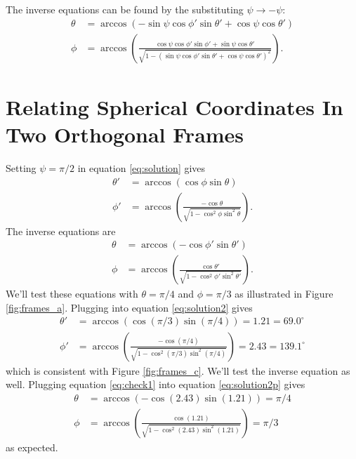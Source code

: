 \documentclass[11pt]{article}
\begin{document}
The inverse equations can be found by the substituting $\psi \rightarrow -\psi$:
\begin{subequations}
\begin{align}
  \theta &= \arccos\left(-\sin\psi\cos\phi'\sin\theta' + \cos\psi\cos\theta'\right)\\
  \phi &= \arccos\left(\frac{\cos\psi\cos\phi'\sin\phi' + \sin\psi\cos\theta'}{\sqrt{1 - (\sin\psi\cos\phi'\sin\theta' + \cos\psi\cos\theta')^2}}\right).
\end{align}\label{eq:solutionp}%
\end{subequations}


\section{Relating Spherical Coordinates In Two Orthogonal Frames}
Setting $\psi = \pi/2$ in equation \ref{eq:solution} gives
\begin{subequations}
  \begin{align}
  \theta' &= \arccos\left(\cos\phi\sin\theta\right)\\
  \phi' &= \arccos\left(\frac{-\cos\theta}{\sqrt{1 - \cos^2\phi\sin^2\theta}}\right).
\end{align} \label{eq:solution2}%
\end{subequations}
The inverse equations are
\begin{subequations}
\begin{align}
  \theta &= \arccos\left(-\cos\phi'\sin\theta'\right)\\
  \phi &= \arccos\left(\frac{\cos\theta'}{\sqrt{1 - \cos^2\phi'\sin^2\theta'}}\right).
\end{align} \label{eq:solution2p}%
\end{subequations}
We'll test these equations with $\theta = \pi/4$ and $\phi=\pi/3$ as illustrated in
Figure \ref{fig:frames_a}. Plugging into equation \ref{eq:solution2} gives
\begin{subequations}
\begin{align}
  \theta' &= \arccos\left(\cos(\pi/3)\sin(\pi/4)\right) = 1.21 = 69.0^{\circ}\\
  \phi' &= \arccos\left(\frac{-\cos(\pi/4)}{\sqrt{1 - \cos^2(\pi/3)\sin^2(\pi/4)}}\right) = 2.43 = 139.1^{\circ}
\end{align}\label{eq:check1}%
\end{subequations}
which is consistent with Figure \ref{fig:frames_c}. We'll test the inverse equation as
well. Plugging equation \ref{eq:check1} into equation \ref{eq:solution2p} gives
\begin{subequations}
\begin{align}
  \theta &= \arccos\left(-\cos(2.43)\sin(1.21)\right) = \pi/4\\
  \phi &= \arccos\left(\frac{\cos(1.21)}{\sqrt{1 - \cos^2(2.43)\sin^2(1.21)}}\right) = \pi/3
\end{align}\label{eq:check1}%
\end{subequations}
as expected. 
\end{document}
